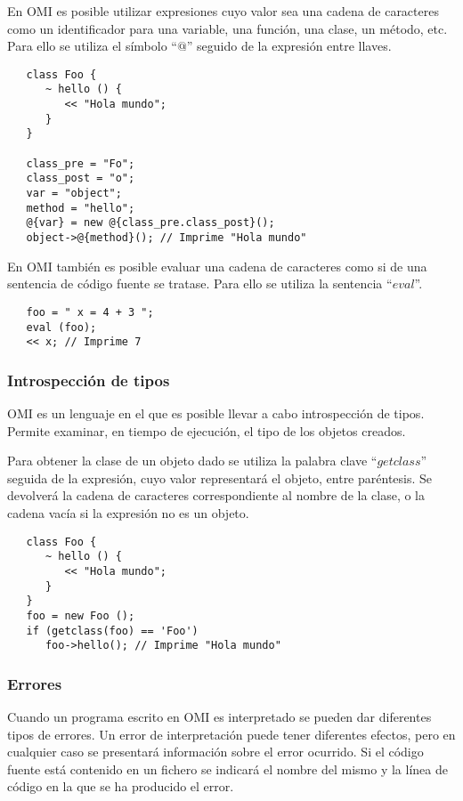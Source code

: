 En OMI es posible utilizar expresiones cuyo valor sea una cadena de caracteres como un identificador para una variable, una función, una clase, un método, etc. Para ello se 
utiliza el símbolo ``$@$'' seguido de la expresión entre llaves. \\

\begin{lstlisting}
   class Foo {
      ~ hello () {
         << "Hola mundo";
      }
   }
   
   class_pre = "Fo";
   class_post = "o";
   var = "object";
   method = "hello";
   @{var} = new @{class_pre.class_post}();
   object->@{method}(); // Imprime "Hola mundo"
\end{lstlisting}

En OMI también es posible evaluar una cadena de caracteres como si de una sentencia de código fuente se tratase. Para ello se utiliza la sentencia ``$eval$''. \\

\begin{lstlisting}
   foo = " x = 4 + 3 ";
   eval (foo);
   << x; // Imprime 7
\end{lstlisting}

\subsubsection{Introspección de tipos}

OMI es un lenguaje en el que es posible llevar a cabo introspección de tipos. Permite examinar, en tiempo de ejecución, el tipo de los objetos creados. 

Para obtener la clase de un objeto dado se utiliza la palabra clave ``$getclass$'' seguida de la expresión, cuyo valor representará el objeto, entre paréntesis. Se devolverá
la cadena de caracteres correspondiente al nombre de la clase, o la cadena vacía si la expresión no es un objeto. \\

\begin{lstlisting}
   class Foo {
      ~ hello () {
         << "Hola mundo";
      }
   }
   foo = new Foo ();
   if (getclass(foo) == 'Foo')
      foo->hello(); // Imprime "Hola mundo"
\end{lstlisting}

\subsubsection{Errores} \label{sec:error}
Cuando un programa escrito en OMI es interpretado se pueden dar diferentes tipos de errores. Un error de interpretación 
puede tener diferentes efectos, pero en cualquier caso se presentará información sobre el error ocurrido. Si el código fuente está contenido en un fichero 
se indicará el nombre del mismo y la línea de código en la que se ha producido el error. 

